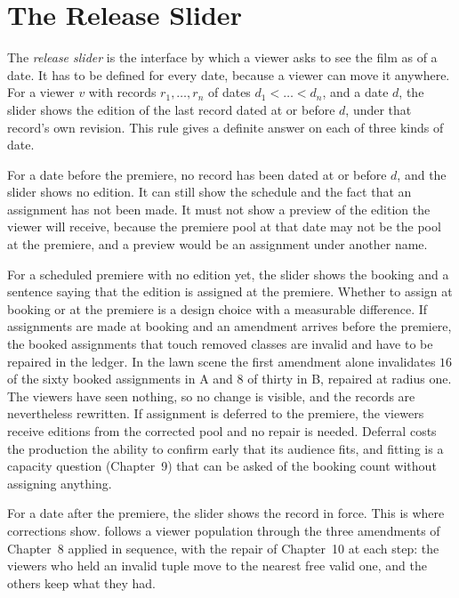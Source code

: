 \documentclass[11pt,twoside,openright]{book}
\theoremstyle{plain}
\theoremstyle{definition}
\theoremstyle{remark}
\begin{document}
\section{The Release Slider}\label{sec:slider}

The \emph{release slider} is the interface by which a viewer asks to see the film as of a date. It has to be defined for every date, because a viewer can move it anywhere. For a viewer $v$ with records $r_1,\dots,r_n$ of dates $d_1<\dots<d_n$, and a date $d$, the slider shows the edition of the last record dated at or before $d$, under that record's own revision. This rule gives a definite answer on each of three kinds of date.

For a date before the premiere, no record has been dated at or before $d$, and the slider shows no edition. It can still show the schedule and the fact that an assignment has not been made. It must not show a preview of the edition the viewer will receive, because the premiere pool at that date may not be the pool at the premiere, and a preview would be an assignment under another name.

For a scheduled premiere with no edition yet, the slider shows the booking and a sentence saying that the edition is assigned at the premiere. Whether to assign at booking or at the premiere is a design choice with a measurable difference. If assignments are made at booking and an amendment arrives before the premiere, the booked assignments that touch removed classes are invalid and have to be repaired in the ledger. In the lawn scene the first amendment alone invalidates $16$ of the sixty booked assignments in A and $8$ of thirty in B, repaired at radius one. The viewers have seen nothing, so no change is visible, and the records are nevertheless rewritten. If assignment is deferred to the premiere, the viewers receive editions from the corrected pool and no repair is needed. Deferral costs the production the ability to confirm early that its audience fits, and fitting is a capacity question (Chapter~9) that can be asked of the booking count without assigning anything.

For a date after the premiere, the slider shows the record in force. This is where corrections show.  follows a viewer population through the three amendments of Chapter~8 applied in sequence, with the repair of Chapter~10 at each step: the viewers who held an invalid tuple move to the nearest free valid one, and the others keep what they had.
\end{document}
